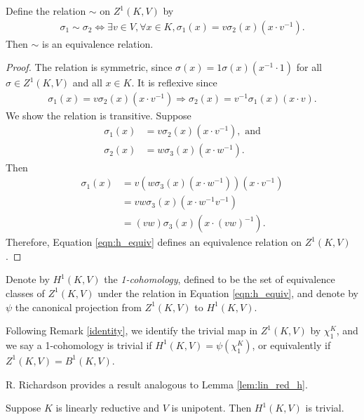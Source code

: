 \begin{lemma} Define the relation $\sim$ on $Z^1(K, V)$ by
	\begin{align}
		\sigma_1 \sim \sigma_2 \Leftrightarrow \exists v \in V,\forall x \in K, \sigma_1(x) = v\sigma_2(x)(x \cdot v^{-1}).
		\label{eqn:h_equiv}
	\end{align}
Then $\sim$ is an equivalence relation.
\end{lemma}
\begin{proof}
The relation is symmetric, since $\sigma(x) = 1\sigma(x)(x^{-1} \cdot 1)$ for all $\sigma\in Z^1(K, V)$ and all $x \in K$. It is reflexive since
\begin{align*}
	\sigma_1(x) = v \sigma_2(x)(x \cdot v^{-1}) \Rightarrow \sigma_2(x) = v^{-1}\sigma_1(x)(x\cdot v).
\end{align*}
We show the relation is transitive. Suppose
\begin{align*}
	\sigma_1(x) &= v\sigma_2(x)(x\cdot v^{-1}),\textrm{ and} \\
	\sigma_2(x) &= w\sigma_3(x)(x\cdot w^{-1}).
\end{align*}
Then
\begin{align*}
	\sigma_1(x) &= v\left(w \sigma_3(x)(x\cdot w^{-1})\right)\left(x\cdot v^{-1}\right) \\
		&= vw \sigma_3(x)\left(x\cdot w^{-1}v^{-1}\right) \\
		&= (vw) \sigma_3(x)\left(x\cdot (vw)^{-1}\right).
\end{align*}
Therefore, Equation \ref{eqn:h_equiv} defines an equivalence relation on $Z^1(K, V)$.
\end{proof}

\begin{definition}
Denote by $H^1(K, V)$ the \emph{1-cohomology}, defined to be the set of equivalence classes of $Z^1(K, V)$ under the relation in Equation \ref{eqn:h_equiv}, and denote by $\psi$ the canonical projection from $Z^1(K, V)$ to $H^1(K, V)$.
\end{definition}

\begin{remark}\label{trivial}
Following Remark \ref{identity}, we identify the trivial map in $Z^1(K, V)$ by $\chi^K_1$, and we say a 1-cohomology is trivial if $H^1(K, V) = \psi(\chi^K_1)$, or equivalently if $Z^1(K, V) = B^1(K, V)$.
\end{remark}

R. Richardson \cite[Lemma 6.2.6]{richardson1982orbits} provides a result analogous to Lemma \ref{lem:lin_red_h}.
\begin{lemma}
  Suppose $K$ is linearly reductive and $V$ is unipotent. Then $H^1(K, V)$ is trivial.
  \label{lem:nonab_lin_red}
\end{lemma}

